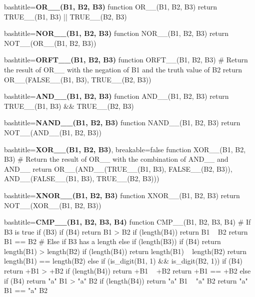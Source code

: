 \begin{NexCodeBox}{bash}{title=\textbf{OR\_\_(B1, B2, B3)}}
function OR__(B1, B2, B3)
{
        return TRUE__(B1, B3) || TRUE\_\_(B2, B3)
}
\end{NexCodeBox}

\begin{NexCodeBox}{bash}{title=\textbf{NOR\_\_(B1, B2, B3)}}
function NOR__(B1, B2, B3)
{
        return NOT__(OR__(B1, B2, B3))
}
\end{NexCodeBox}

\begin{NexCodeBox}{bash}{title=\textbf{ORFT\_\_(B1, B2, B3)}}
function ORFT__(B1, B2, B3)
{
        # Return the result of OR__ with the negation of B1 and the truth value of B2
        return OR__(FALSE__(B1, B3), TRUE__(B2, B3))
}
\end{NexCodeBox}

\begin{NexCodeBox}{bash}{title=\textbf{AND\_\_(B1, B2, B3)}}
function AND\_\_(B1, B2, B3)
{
        return TRUE__(B1, B3) && TRUE__(B2, B3)
}
\end{NexCodeBox}

\begin{NexCodeBox}{bash}{title=\textbf{NAND\_\_(B1, B2, B3)}}
function NAND__(B1, B2, B3)
{
        return NOT__(AND__(B1, B2, B3))
}
\end{NexCodeBox}

\begin{NexCodeBox}{bash}{title=\textbf{XOR\_\_(B1, B2, B3)}, breakable=false}
function XOR__(B1, B2, B3)
{
        # Return the result of OR__ with the combination of AND__ and AND__
        return OR__(AND__(TRUE__(B1, B3), FALSE__(B2, B3)), 
                    AND__(FALSE__(B1, B3), TRUE__(B2, B3)))
}
\end{NexCodeBox}

\begin{NexCodeBox}{bash}{title=\textbf{XNOR\_\_(B1, B2, B3)}}
function XNOR__(B1, B2, B3)
{
        return NOT__(XOR__(B1, B2, B3))
}
\end{NexCodeBox}

\begin{NexCodeBox}{bash}{title=\textbf{CMP\_\_(B1, B2, B3, B4)}}
function CMP__(B1, B2, B3, B4)
{
        # If B3 is true
        if (B3) {
                if (B4)
                        return B1 > B2
                if (length(B4))
                        return B1 ~ B2
                return B1 == B2
        # Else if B3 has a length
        } else if (length(B3)) {
                if (B4)
                        return length(B1) > length(B2)
                if (length(B4))
                        return length(B1) ~ length(B2)
                return length(B1) == length(B2)
        } else if (is_digit(B1, 1) && is_digit(B2, 1)) {
                if (B4)
                        return +B1 > +B2
                if (length(B4))
                        return +B1 ~ +B2
                return +B1 == +B2
        } else {
                if (B4)
                        return "a" B1 > "a" B2
                if (length(B4))
                        return "a" B1 ~ "a" B2
                return "a" B1 == "a" B2
        }
}
\end{NexCodeBox}


